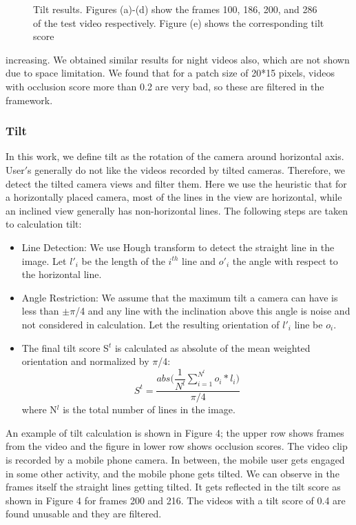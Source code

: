 \documentclass{sig-alternate-05-2015}
\begin{document}
\begin{itemize}
\begin{figure}
\caption{Tilt results. Figures (a)-(d) show the frames 100, 186,
200, and 286 of the test video respectively. Figure (e) shows the
corresponding tilt score}
\end{figure}
increasing. We obtained similar results for night videos
also, which are not shown due to space limitation. We found that
for a patch size of 20*15 pixels, videos with occlusion score more
than 0.2 are very bad, so these are filtered in the framework.
\end{itemize}
\subsubsection{Tilt}
In this work, we define tilt as the rotation of the camera around
horizontal axis. User$'$s generally do not like the videos recorded
by tilted cameras. Therefore, we detect the tilted camera views
and filter them. Here we use the heuristic that for a horizontally
placed camera, most of the lines in the view are horizontal, while
an inclined view generally has non-horizontal lines. The following
steps are taken to calculation tilt:
\begin{itemize}
    \item Line Detection: We use Hough transform to detect the straight
line in the image. Let $l'_i$ be the length of the $i^{th}$ line and $o'_i$
the angle with respect to the horizontal line.
    \item  Angle Restriction: We assume that the maximum tilt a camera can have is less than $\pm\pi$/4 and any line with the inclination above this angle is noise and not considered in calculation. Let the resulting orientation of $l'_i$ line be $o_i$.
    \item The final tilt score S$^t$ is calculated as absolute of the mean
weighted orientation and normalized by $\pi$/4:
\begin{equation}
    S^t=\dfrac{abs\bigg(\dfrac{1}{N^l}\sum_{i=1}^{N^l} o_i*l_i\bigg)}{\pi/4}
\end{equation}
where N$^l$ is the total number of lines in the image.
\end{itemize}\par
An example of tilt calculation is shown in Figure 4; the upper
row shows frames from the video and the figure in lower row shows
occlusion scores. The video clip is recorded by a mobile phone
camera. In between, the mobile user gets engaged in some other
activity, and the mobile phone gets tilted. We can observe in the
frames itself the straight lines getting tilted. It gets reflected in the
tilt score as shown in Figure 4 for frames 200 and 216. The videos
with a tilt score of 0.4 are found unusable and they are filtered.
\end{document}

